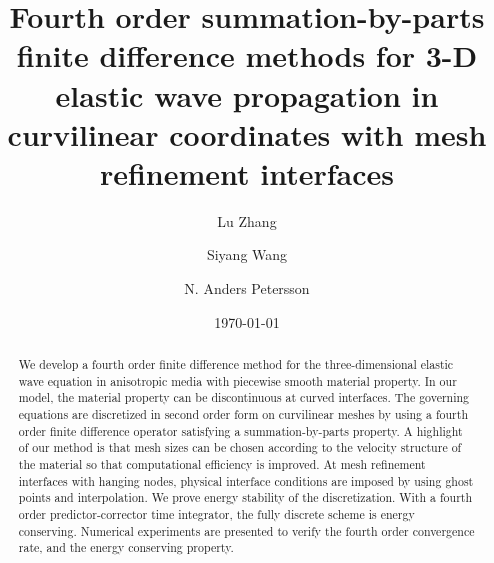 \documentclass[11pt]{article}
\title{Fourth order summation-by-parts finite difference methods for  3-D elastic wave propagation in curvilinear coordinates with mesh refinement interfaces}
\date{\today}
\author{ Lu Zhang \and Siyang Wang \and N. Anders Petersson}
\begin{document}
\maketitle

\begin{abstract}
We develop a fourth order finite difference method for the three-dimensional elastic wave equation in anisotropic media with piecewise smooth material property. In our model, the material property can be discontinuous at curved interfaces. The governing equations are discretized in second order form on curvilinear meshes by using a fourth order finite difference operator satisfying a summation-by-parts property. A highlight of our method is that mesh sizes can be chosen according to the velocity structure of the material so that computational efficiency is improved. At mesh refinement interfaces with hanging nodes, physical interface conditions are imposed by using ghost points and interpolation. We prove energy stability of the discretization.  With a fourth order predictor-corrector time integrator, the fully discrete scheme is energy conserving. Numerical experiments are presented to verify the fourth order convergence rate, and the energy conserving property. 
\end{abstract}





%

%

%







%

%

%

%

%
























\end{document}
